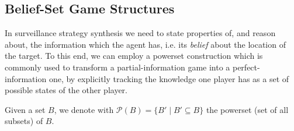 \subsection{Belief-Set Game Structures}

In surveillance strategy synthesis we need to state properties of, and reason about, the information which the agent has, i.e. its \emph{belief} about the location of the target. To this end, we can employ a powerset construction which is commonly used to transform a partial-information game into a perfect-information one, by explicitly tracking the knowledge one player has as a set of possible states of the other player.

Given a set $B$, we denote with $\mathcal{P}(B) = \{B' \mid B'\subseteq B\}$ the powerset (set of all subsets) of $B$.

